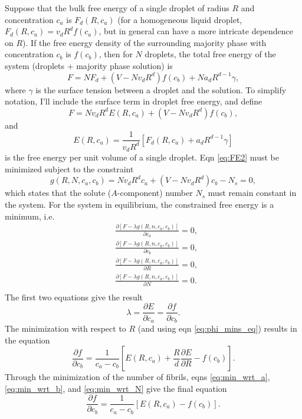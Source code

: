 \documentclass[12pt]{article}
\begin{document}
Suppose that the bulk free energy of a single droplet of radius $R$ and concentration $c_a$ is $F_d(R,c_a)$ (for a homogeneous liquid droplet, $F_d(R,c_a)=v_dR^df(c_a)$, but in general can have a more intricate dependence on $R$). If the free energy density of the surrounding majority phase with concentration $c_b$ is $f(c_b)$, then for $N$ droplets, the total free energy of the system (droplets + majority phase solution) is
\begin{equation}\label{eq:FE1}
F=NF_d+(V-Nv_dR^d)f(c_b)+Na_dR^{d-1}\gamma,
\end{equation}
where $\gamma$ is the surface tension between a droplet and the solution. To simplify notation, I'll include the surface term in droplet free energy, and define
\begin{equation}\label{eq:FE2}
F=Nv_dR^dE(R,c_a)+(V-Nv_dR^d)f(c_b),
\end{equation}
and
\begin{equation}\label{eq:E_R}
E(R,c_a)=\frac{1}{v_dR^d}\left[F_d(R,c_a)+a_dR^{d-1}\gamma\right]
\end{equation}
is the free energy per unit volume of a single droplet. Eqn \ref{eq:FE2} must be minimized subject to the constraint
\begin{equation}\label{eq:N_s}
g(R,N,c_a,c_b)=Nv_dR^dc_a+(V-Nv_dR^d)c_b-N_s=0,
\end{equation}
which states that the solute ($A$-component) number $N_s$ must remain constant in the system. For the system in equilibrium, the constrained free energy is a minimum, i.e.
\begin{align}
&\frac{\partial [F-\lambda g(R,n,c_a,c_b)]}{\partial c_a} = 0\label{eq:min_wrt_a},\\
&\frac{\partial [F-\lambda g(R,n,c_a,c_b)]}{\partial c_b} = 0\label{eq:min_wrt_b},\\
&\frac{\partial [F-\lambda g(R,n,c_a,c_b)]}{\partial R} = 0\label{eq:min_wrt_R},\\
&\frac{\partial [F-\lambda g(R,n,c_a,c_b)]}{\partial N} = 0\label{eq:min_wrt_N}.\\
\end{align}
The first two equations give the result
\begin{equation}\label{eq:phi_mins_eq}
\lambda=\frac{\partial E}{\partial c_a}=\frac{\partial f}{\partial c_b}.
\end{equation}
The minimization with respect to $R$ (and using eqn \ref{eq:phi_mins_eq}) results in the equation
\begin{equation}\label{eq:R_min_eq}
\frac{\partial f}{\partial c_b}=\frac{1}{c_a-c_b}\left[E(R,c_a)+\frac{R}{d}\frac{\partial E}{\partial R}-f(c_b)\right].
\end{equation}
Through the minimization of the number of fibrils, eqns \ref{eq:min_wrt_a}, \ref{eq:min_wrt_b}, and \ref{eq:min_wrt_N} give the final equation
\begin{equation}\label{eq:N_min_eq}
\frac{\partial f}{\partial c_b}=\frac{1}{c_a-c_b}\left[E(R,c_a)-f(c_b)\right].
\end{equation}
\end{document}
